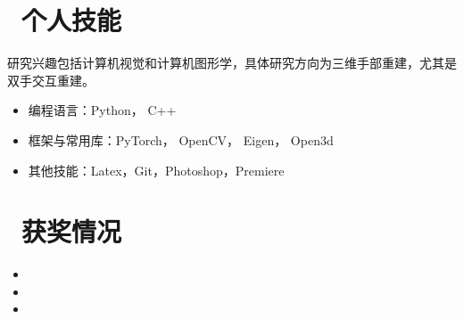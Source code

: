 \documentclass{resume}
\begin{document}
\section{\faCogs\ 个人技能}
研究兴趣包括计算机视觉和计算机图形学，具体研究方向为三维手部重建，尤其是双手交互重建。
\begin{itemize}
  \item 编程语言：Python， C++
  \item 框架与常用库：PyTorch， OpenCV， Eigen， Open3d
  \item 其他技能：Latex，Git，Photoshop，Premiere
\end{itemize}

\section{\faTrophy\ 获奖情况}
\begin{itemize}
    \item{}
    \item{}
    \item {}
\end{itemize}
\end{document}
